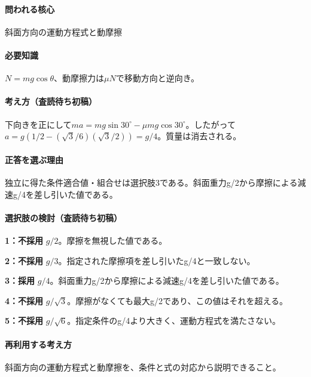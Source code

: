 \paragraph{問われる核心} 斜面方向の運動方程式と動摩擦

\paragraph{必要知識} \(N=mg\cos\theta\)、動摩擦力は\(\mu N\)で移動方向と逆向き。

\paragraph{考え方（査読待ち初稿）} 下向きを正にして\(ma=mg\sin30^\circ-\mu mg\cos30^\circ\)。したがって\(a=g(1/2-(\sqrt3/6)(\sqrt3/2))=g/4\)。質量は消去される。

\paragraph{正答を選ぶ理由} 独立に得た条件適合値・組合せは選択肢3である。斜面重力g/2から摩擦による減速g/4を差し引いた値である。

\paragraph{選択肢の検討（査読待ち初稿）}

\noindent\textbf{1：不採用} \(g/2\)。摩擦を無視した値である。\par

\noindent\textbf{2：不採用} \(g/3\)。指定された摩擦項を差し引いたg/4と一致しない。\par

\noindent\textbf{3：採用} \(g/4\)。斜面重力g/2から摩擦による減速g/4を差し引いた値である。\par

\noindent\textbf{4：不採用} \(g/\sqrt{3}\)。摩擦がなくても最大g/2であり、この値はそれを超える。\par

\noindent\textbf{5：不採用} \(g/\sqrt{6}\)。指定条件のg/4より大きく、運動方程式を満たさない。\par

\paragraph{再利用する考え方} 斜面方向の運動方程式と動摩擦を、条件と式の対応から説明できること。

